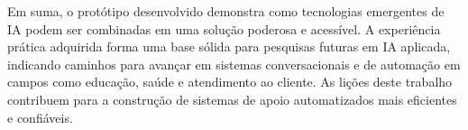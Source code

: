 \documentclass[12pt, openright, oneside, a4paper, brazil]{ads-unipac-abntex2}
\begin{document}
Em suma, o protótipo desenvolvido demonstra como tecnologias emergentes de IA podem ser combinadas em uma solução poderosa e acessível. A experiência prática adquirida forma uma base sólida para pesquisas futuras em IA aplicada, indicando caminhos para avançar em sistemas conversacionais e de automação em campos como educação, saúde e atendimento ao cliente. As lições deste trabalho contribuem para a construção de sistemas de apoio automatizados mais eficientes e confiáveis.

 

\postextual


\end{document}
